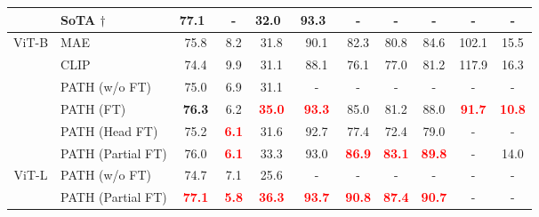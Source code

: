 \documentclass[10pt,twocolumn,letterpaper]{article}
\begin{document}
\begin{table*}[htbp]
\begin{minipage}[t]{0.996\textwidth}
{\begin{tabular}{cl|ccccccc|cc}
          & SoTA $\dag$ & 77.1~\cite{xu2022vitpose}  & -   & 32.0~\cite{xu2022vitpose}    & \cellcolor[rgb]{ .949,  .949,  .949} 93.3~\cite{xu2022vitpose} & -   & -   & \cellcolor[rgb]{ .949,  .949,  .949} - &  - &  - \\
    \midrule
    \multirow{6}[4]{*}{ViT-B} & MAE   & 75.8  & 8.2   & 31.8  & \cellcolor[rgb]{ .949,  .949,  .949} 90.1  & 82.3  & 80.8  & \cellcolor[rgb]{ .949,  .949,  .949} 84.6  &  102.1  &  15.5 \\
          & CLIP  & 74.4  & 9.9   & 31.1  & \cellcolor[rgb]{ .949,  .949,  .949} 88.1  & 76.1  & 77.0  & \cellcolor[rgb]{ .949,  .949,  .949} 81.2  &  117.9  & 16.3 \\
\cmidrule{2-11}          & PATH (w/o FT) & 75.0  & 6.9   & 31.1  & \cellcolor[rgb]{ .949,  .949,  .949} -  & -   & -   & \cellcolor[rgb]{ .949,  .949,  .949} - &  - &  - \\
          & PATH (FT) & \textbf{76.3}  & 6.2   & \textcolor{red}{\textbf{35.0}}  & \cellcolor[rgb]{ .949,  .949,  .949} \textcolor{red}{\textbf{93.3}}  & 85.0  & 81.2  & \cellcolor[rgb]{ .949,  .949,  .949} 88.0  &  \textcolor{red}{\textbf{91.7}}  &  \textcolor{red}{\textbf{10.8}} \\
& PATH (Head FT) & 75.2  & \textcolor{red}{\textbf{6.1}}   & 31.6  & \cellcolor[rgb]{ .949,  .949,  .949} 92.7  & 77.4  & 72.4  & \cellcolor[rgb]{ .949,  .949,  .949} 79.0  &  - &  - \\
          & PATH (Partial FT) & 76.0  & \textcolor{red}{\textbf{6.1}}   & 33.3  & \cellcolor[rgb]{ .949,  .949,  .949} 93.0  & \textcolor{red}{\textbf{86.9}}  & \textcolor{red}{\textbf{83.1}}  & \cellcolor[rgb]{ .949,  .949,  .949} \textcolor{red}{\textbf{89.8}}  &  - &  14.0 \\
\cmidrule{1-11}    \multirow{2}[2]{*}{ViT-L} & PATH (w/o FT) & 74.7  & 7.1   & 25.6  & \cellcolor[rgb]{ .949,  .949,  .949} - & -   & -   & \cellcolor[rgb]{ .949,  .949,  .949} - &  - &  - \\
          & PATH (Partial FT) & \textcolor{red}{\textbf{77.1}}  & \textcolor{red}{\textbf{5.8}}   & \textcolor{red}{\textbf{36.3}}  & \cellcolor[rgb]{ .949,  .949,  .949} \textcolor{red}{\textbf{93.7}}  & \textcolor{red}{\textbf{90.8}}  & \textcolor{red}{\textbf{87.4}}  & \cellcolor[rgb]{ .949,  .949,  .949} \textcolor{red}{\textbf{90.7}}  &  - &  -\\
    \bottomrule
    \end{tabular}}
  \end{minipage}
  \label{tab_main_res}
\end{table*}
\end{document}
